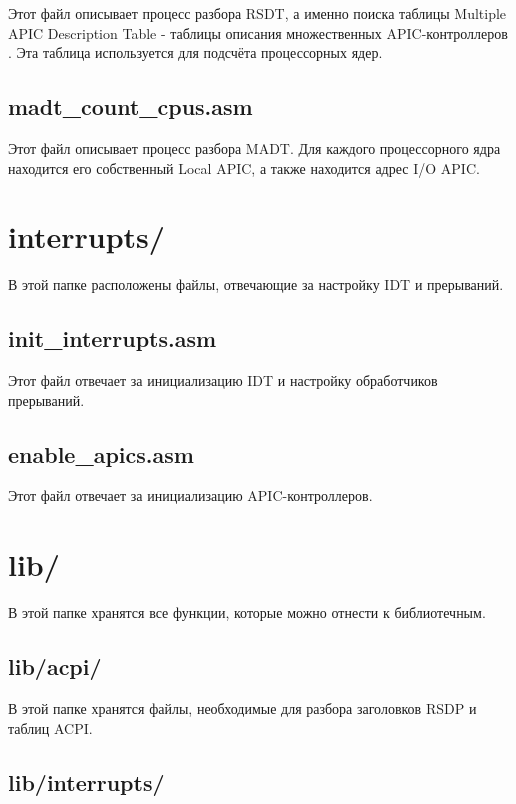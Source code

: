 Этот файл описывает процесс разбора RSDT, а именно поиска таблицы Multiple APIC Description Table \cite{madt} - таблицы описания множественных APIC-контроллеров \cite{apics}. Эта таблица используется для подсчёта процессорных ядер.

\subsection{madt\_count\_cpus.asm}

Этот файл описывает процесс разбора MADT. Для каждого процессорного ядра находится его собственный Local APIC, а также находится адрес I/O APIC.

\section{interrupts/}

В этой папке расположены файлы, отвечающие за настройку IDT \cite{idt} и прерываний.

\subsection{init\_interrupts.asm}

Этот файл отвечает за инициализацию IDT и настройку обработчиков прерываний.

\subsection{enable\_apics.asm}

Этот файл отвечает за инициализацию APIC-контроллеров.

\section{lib/}

В этой папке хранятся все функции, которые можно отнести к библиотечным.

\subsection{lib/acpi/}

В этой папке хранятся файлы, необходимые для разбора заголовков RSDP и таблиц ACPI.

\subsection{lib/interrupts/}

